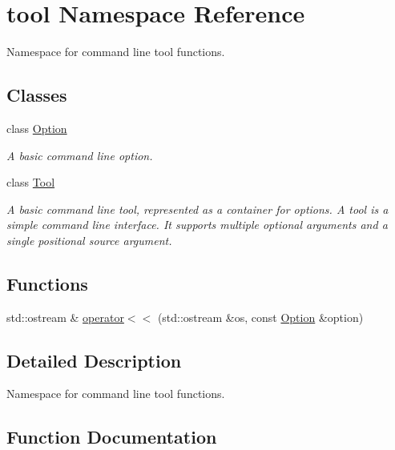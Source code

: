 \hypertarget{namespacetool}{}\section{tool Namespace Reference}
\label{namespacetool}


Namespace for command line tool functions.  


\subsection*{Classes}
\begin{DoxyCompactItemize}
\item 
class \hyperlink{classtool_1_1Option}{Option}
\begin{DoxyCompactList}\small\item\em A basic command line option. \end{DoxyCompactList}\item 
class \hyperlink{classtool_1_1Tool}{Tool}
\begin{DoxyCompactList}\small\item\em A basic command line tool, represented as a container for options. A tool is a simple command line interface. It supports multiple optional arguments and a single positional source argument. \end{DoxyCompactList}\end{DoxyCompactItemize}
\subsection*{Functions}
\begin{DoxyCompactItemize}
\item 
std\+::ostream \& \hyperlink{namespacetool_a75196e510561513ed921058a49ab496b}{operator$<$$<$} (std\+::ostream \&os, const \hyperlink{classtool_1_1Option}{Option} \&option)
\end{DoxyCompactItemize}


\subsection{Detailed Description}
Namespace for command line tool functions. 

\subsection{Function Documentation}
